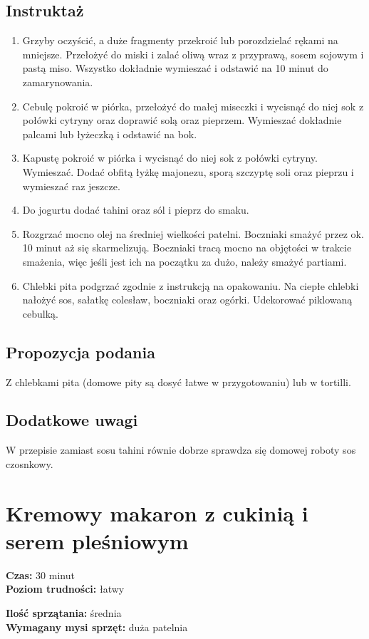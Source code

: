 \documentclass[a4paper,10pt]{book}
\begin{document}
\subsection*{Instruktaż}
\begin{enumerate}
    \item Grzyby oczyścić, a duże fragmenty przekroić lub porozdzielać rękami na mniejsze. Przełożyć do miski i zalać oliwą wraz z przyprawą, sosem sojowym i pastą miso. Wszystko dokładnie wymieszać i odstawić na 10 minut do zamarynowania.
    \item Cebulę pokroić w piórka, przełożyć do małej miseczki i wycisnąć do niej sok z połówki cytryny oraz doprawić solą oraz pieprzem. Wymieszać dokładnie palcami lub łyżeczką i odstawić na bok.
    \item Kapustę pokroić w piórka i wycisnąć do niej sok z połówki cytryny. Wymieszać. Dodać obfitą łyżkę majonezu, sporą szczyptę soli oraz pieprzu i wymieszać raz jeszcze. 
    \item Do jogurtu dodać tahini oraz sól i pieprz do smaku.
    \item Rozgrzać mocno olej na średniej wielkości patelni. Boczniaki smażyć przez ok. 10 minut aż się skarmelizują. Boczniaki tracą mocno na objętości w trakcie smażenia, więc jeśli jest ich na początku za dużo, należy smażyć partiami.
    \item Chlebki pita podgrzać zgodnie z instrukcją na opakowaniu. Na ciepłe chlebki nałożyć sos, sałatkę colesław, boczniaki oraz ogórki. Udekorować piklowaną cebulką.
\end{enumerate}

\vspace{0.5cm} 

\small
\subsection*{Propozycja podania}
Z chlebkami pita (domowe pity są dosyć łatwe w przygotowaniu) lub w tortilli.

\vspace{0.3cm}

\subsection*{Dodatkowe uwagi} W przepisie zamiast sosu tahini równie dobrze sprawdza się domowej roboty sos czosnkowy.

\section{Kremowy makaron z cukinią i serem pleśniowym}
\bigskip
\small
\begin{minipage}{0.45\textwidth}
    \noindent \textbf{Czas:} 30 minut \\
    \textbf{Poziom trudności:} łatwy
\end{minipage}
\begin{minipage}{0.45\textwidth}
    \noindent \textbf{Ilość sprzątania:} średnia\\
    \textbf{Wymagany mysi sprzęt:} duża patelnia
\end{minipage}
\normalsize
\vspace{0.5cm}
\end{document}
